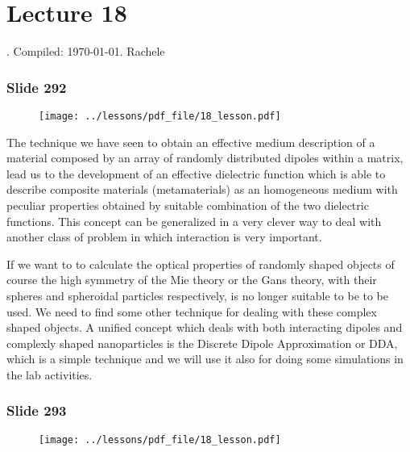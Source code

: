\documentclass[../main/main.tex]{subfiles}
\begin{document}
\renewcommand\vec{\mathbf}

\section{Lecture 18}
.  Compiled:  \today. Rachele 

\subsubsection{Slide 292}

\begin{figure}[h!]
\centering
\texttt{[image: ../lessons/pdf\_file/18\_lesson.pdf]}
\end{figure}


The technique we have seen to obtain an effective medium description of a material composed by an array of randomly distributed dipoles within a matrix, lead us to the development of an effective dielectric function which is able to describe composite materials (metamaterials) as an homogeneous medium with peculiar properties obtained by suitable combination of the two dielectric functions.
This concept can be generalized in a very clever way to deal with another class of problem in which interaction is very important. 

If we want to to calculate the optical properties of randomly shaped objects of course the high symmetry of the Mie theory or the Gans theory, with their spheres and spheroidal particles respectively, is no longer suitable to be to be used. We need to find some other technique for dealing with these complex shaped objects.
A unified concept which deals with both interacting dipoles and complexly shaped nanoparticles is the Discrete Dipole Approximation or DDA, which is a simple technique and we will use it also for doing some simulations in the lab activities.

\newpage

\subsubsection{Slide 293}

\begin{figure}[h!]
\centering
\texttt{[image: ../lessons/pdf\_file/18\_lesson.pdf]}
\end{figure}
\end{document}
